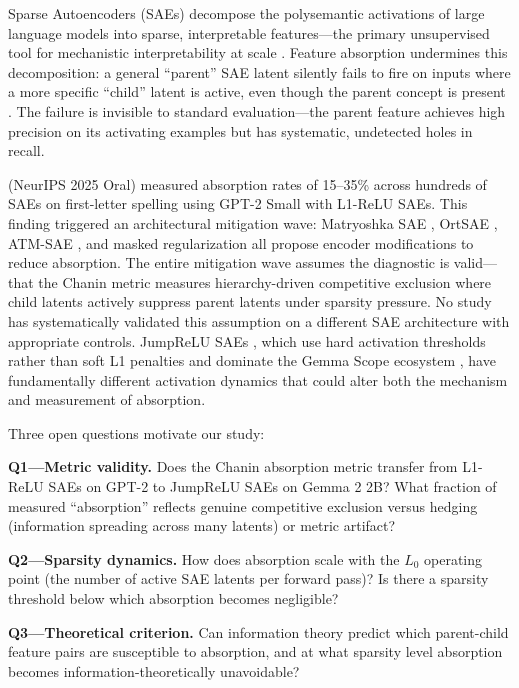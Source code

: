 \documentclass{article}
\begin{document}
Sparse Autoencoders (SAEs) decompose the polysemantic activations of large language models into sparse, interpretable features---the primary unsupervised tool for mechanistic interpretability at scale \citep{cunningham2023sparse, bricken2023monosemanticity, templeton2024scaling}. Feature absorption undermines this decomposition: a general ``parent'' SAE latent silently fails to fire on inputs where a more specific ``child'' latent is active, even though the parent concept is present \citep{chanin2024absorption}. The failure is invisible to standard evaluation---the parent feature achieves high precision on its activating examples but has systematic, undetected holes in recall.

\citet{chanin2024absorption} (NeurIPS 2025 Oral) measured absorption rates of 15--35\% across hundreds of SAEs on first-letter spelling using GPT-2 Small with L1-ReLU SAEs. This finding triggered an architectural mitigation wave: Matryoshka SAE \citep{bussmann2025matryoshka}, OrtSAE \citep{korznikov2025ortsae}, ATM-SAE \citep{li2025atm}, and masked regularization \citep{narayanaswamy2026masked} all propose encoder modifications to reduce absorption. The entire mitigation wave assumes the diagnostic is valid---that the Chanin metric measures hierarchy-driven competitive exclusion where child latents actively suppress parent latents under sparsity pressure. No study has systematically validated this assumption on a different SAE architecture with appropriate controls. JumpReLU SAEs \citep{rajamanoharan2024jumprelu}, which use hard activation thresholds rather than soft L1 penalties and dominate the Gemma Scope ecosystem \citep{lieberum2024gemmascope}, have fundamentally different activation dynamics that could alter both the mechanism and measurement of absorption.

Three open questions motivate our study:

\textbf{Q1---Metric validity.} Does the Chanin absorption metric transfer from L1-ReLU SAEs on GPT-2 to JumpReLU SAEs on Gemma 2 2B? What fraction of measured ``absorption'' reflects genuine competitive exclusion versus hedging (information spreading across many latents) or metric artifact?

\textbf{Q2---Sparsity dynamics.} How does absorption scale with the $L_0$ operating point (the number of active SAE latents per forward pass)? Is there a sparsity threshold below which absorption becomes negligible?

\textbf{Q3---Theoretical criterion.} Can information theory predict which parent-child feature pairs are susceptible to absorption, and at what sparsity level absorption becomes information-theoretically unavoidable?
\end{document}
